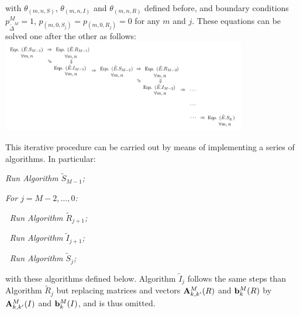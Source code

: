 \documentclass[10pt,A4paper]{article}
\begin{document}
\par\noindent with $\theta_{(m,n,S)}$, $\theta_{(m,n,I)}$ and $\theta_{(m,n,R)}$ defined before, and boundary conditions $p^M_{{\tilde \Delta}^M}=1$, $p_{(m,0,S_j)}=p_{(m,0,R_j)}=0$ for any $m$ and $j$. These equations can be solved one after the other as follows:\\

{\centering
\includegraphics[width=0.8\textwidth]{FigureSolutionNew.jpg}}

\par This iterative procedure can be carried out by means of implementing a series of algorithms. In particular:

\begin{description}
  \item \it Run Algorithm ${\tilde S}_{M-1}$;
  \item \it For $j=M-2,\dots,0$:
  \item $~$\hspace{0.5cm} \it Run Algorithm ${\tilde R}_{j+1}$;
  \item $~$\hspace{0.5cm} \it Run Algorithm ${\tilde I}_{j+1}$;
  \item $~$\hspace{0.5cm} \it Run Algorithm ${\tilde S}_{j}$;
\end{description}

\par\noindent with these algorithms defined below. Algorithm ${\tilde I}_j$ follows the same steps than Algorithm ${\tilde R_j}$ but replacing matrices
and vectors ${\bf A}^M_{k,k'}(R)$ and ${\bf b}^M_k(R)$ by ${\bf A}^M_{k,k'}(I)$ and ${\bf b}^M_k(I)$, and is thus omitted.
\end{document}
